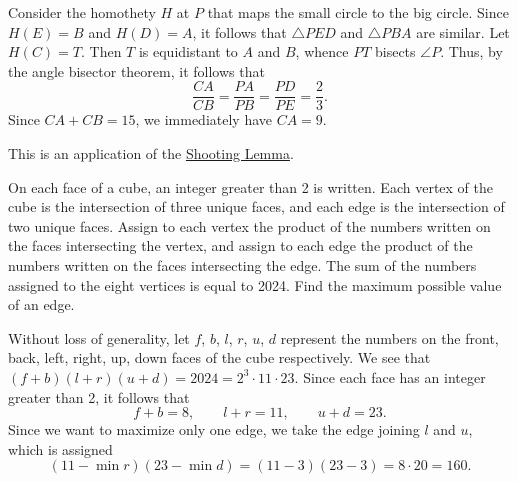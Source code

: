 \begin{solution*}
    Consider the homothety $H$ at $P$ that maps the small circle to the big circle. Since $H(E) = B$ and $H(D) = A$, it follows that $\triangle PED$ and $\triangle PBA$ are similar. Let $H(C) = T$. Then $T$ is equidistant to $A$ and $B$, whence $PT$ bisects $\angle P$. Thus, by the angle bisector theorem, it follows that \[\frac{CA}{CB} = \frac{PA}{PB} = \frac{PD}{PE} = \frac{2}{3}.\] Since $CA + CB = 15$, we immediately have $CA = 9$.

    \begin{remark}
        This is an application of the \href{https://web.evanchen.cc/handouts/GeoSlang/GeoSlang.pdf}{Shooting Lemma}.
    \end{remark}
\end{solution*}

\clearpage
\begin{question}[160]\label{Q::2024-S-1-18}
    On each face of a cube, an integer greater than 2 is written. Each vertex of the cube is the intersection of three unique faces, and each edge is the intersection of two unique faces. Assign to each vertex the product of the numbers written on the faces intersecting the vertex, and assign to each edge the product of the numbers written on the faces intersecting the edge. The sum of the numbers assigned to the eight vertices is equal to 2024. Find the maximum possible value of an edge.
\end{question}
\begin{solution*}
    Without loss of generality, let $f$, $b$, $l$, $r$, $u$, $d$ represent the numbers on the front, back, left, right, up, down faces of the cube respectively. We see that $(f + b)(l + r)(u + d) = 2024 = 2^3 \cdot 11 \cdot 23$. Since each face has an integer greater than 2, it follows that \[f + b = 8, \qquad l + r = 11, \qquad u + d = 23.\] Since we want to maximize only one edge, we take the edge joining $l$ and $u$, which is assigned \[(11 - \min r)(23 - \min d) = (11-3)(23-3) = 8 \cdot 20 = 160.\]
\end{solution*}

